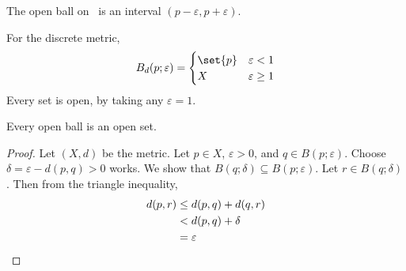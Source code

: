 \begin{examples}
    \item The open ball on \R\ is an interval
    $(p - \varepsilon, p + \varepsilon)$.
    \item
    \item For the discrete metric, \[
        B_d(p; \varepsilon) = \begin{cases}
            \set{p} & \varepsilon < 1 \\
            X & \varepsilon \ge 1
        \end{cases}
    \] Every set is open, by taking any $\varepsilon = 1$.
\end{examples}

\begin{proposition}
    Every open ball is an open set.
\end{proposition}
\begin{proof}
    Let $(X, d)$ be the metric.
    Let $p \in X$, $\varepsilon > 0$, and $q \in B(p; \varepsilon)$.
    Choose $\delta = \varepsilon - d(p, q) > 0$ works.
    We show that $B(q; \delta) \subseteq B(p; \varepsilon)$.
    Let $r \in B(q; \delta)$.
    Then from the triangle inequality, \begin{align*}
        d(p, r) &\le d(p, q) + d(q, r) \\
        &< d(p, q) + \delta \\
        &= \varepsilon \qedhere
    \end{align*}
\end{proof}

